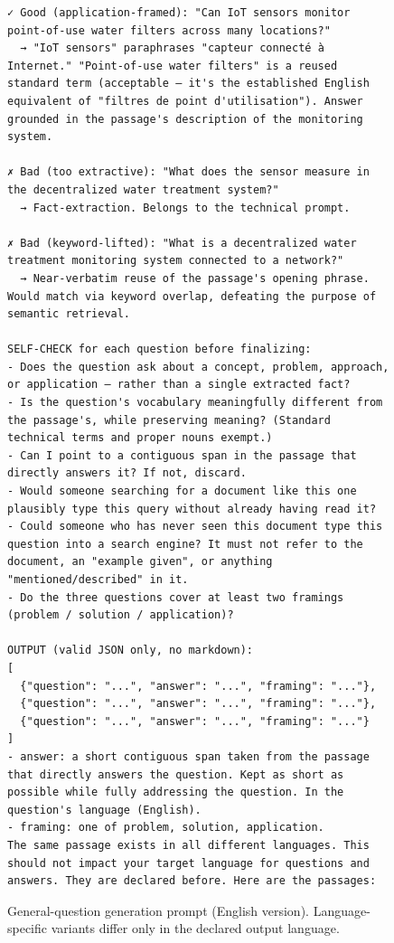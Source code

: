 \begin{figure}[h!]
\begin{minipage}{0.95\textwidth}
\begin{Verbatim}[breaklines=true, breakanywhere=true]
✓ Good (application-framed): "Can IoT sensors monitor point-of-use water filters across many locations?"
  → "IoT sensors" paraphrases "capteur connecté à Internet." "Point-of-use water filters" is a reused standard term (acceptable — it's the established English equivalent of "filtres de point d'utilisation"). Answer grounded in the passage's description of the monitoring system.

✗ Bad (too extractive): "What does the sensor measure in the decentralized water treatment system?"
  → Fact-extraction. Belongs to the technical prompt.

✗ Bad (keyword-lifted): "What is a decentralized water treatment monitoring system connected to a network?"
  → Near-verbatim reuse of the passage's opening phrase. Would match via keyword overlap, defeating the purpose of semantic retrieval.

SELF-CHECK for each question before finalizing:
- Does the question ask about a concept, problem, approach, or application — rather than a single extracted fact?
- Is the question's vocabulary meaningfully different from the passage's, while preserving meaning? (Standard technical terms and proper nouns exempt.)
- Can I point to a contiguous span in the passage that directly answers it? If not, discard.
- Would someone searching for a document like this one plausibly type this query without already having read it?
- Could someone who has never seen this document type this question into a search engine? It must not refer to the document, an "example given", or anything "mentioned/described" in it.
- Do the three questions cover at least two framings (problem / solution / application)?

OUTPUT (valid JSON only, no markdown):
[
  {"question": "...", "answer": "...", "framing": "..."},
  {"question": "...", "answer": "...", "framing": "..."},
  {"question": "...", "answer": "...", "framing": "..."}
]
- answer: a short contiguous span taken from the passage that directly answers the question. Kept as short as possible while fully addressing the question. In the question's language (English).
- framing: one of problem, solution, application.
The same passage exists in all different languages. This should not impact your target language for questions and answers. They are declared before. Here are the passages:
\end{Verbatim}
\end{minipage}
\caption{General-question generation prompt (English version). Language-specific variants differ only in the declared output language.}
\label{fig:prompt-general}
\end{figure}

